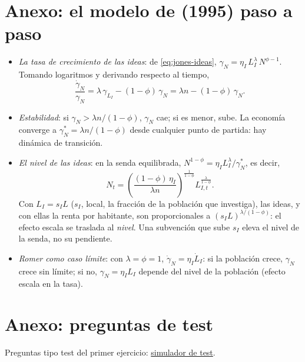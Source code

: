 \documentclass[11pt]{article}
\begin{document}
\section{Anexo: el modelo de  (1995) paso a paso}\label{anexo:jones}

\begin{itemize}
\item \emph{La tasa de crecimiento de las ideas}: de \eqref{eq:jones-ideas}, $\gamma_N=\eta_I\,L_I^{\lambda}\,N^{\phi-1}$. Tomando logaritmos y derivando respecto al tiempo,
  \[\frac{\dot\gamma_N}{\gamma_N}=\lambda\,\gamma_{L_I}-(1-\phi)\,\gamma_N=\lambda n-(1-\phi)\,\gamma_N.\]
\item \emph{Estabilidad}: si $\gamma_N>\lambda n/(1-\phi)$, $\gamma_N$ cae; si es menor, sube. La economía converge a $\gamma_N^*=\lambda n/(1-\phi)$ desde cualquier punto de partida: hay dinámica de transición. \findemo
\item \emph{El nivel de las ideas}: en la senda equilibrada, $N^{1-\phi}=\eta_IL_I^{\lambda}/\gamma_N^*$, es decir,
  \[N_t=\left(\frac{(1-\phi)\,\eta_I}{\lambda n}\right)^{\frac{1}{1-\phi}}L_{I,t}^{\frac{\lambda}{1-\phi}}.\]
  Con $L_I=s_IL$ ($s_I$, local, la fracción de la población que investiga), las ideas, y con ellas la renta por habitante, son proporcionales a $(s_IL)^{\lambda/(1-\phi)}$: el efecto escala se traslada al \emph{nivel}. Una subvención que sube $s_I$ eleva el nivel de la senda, no su pendiente.
\item \emph{Romer como caso límite}: con $\lambda=\phi=1$, $\dot\gamma_N=\eta_I\dot L_I$: si la población crece, $\gamma_N$ crece sin límite; si no, $\gamma_N=\eta_IL_I$ depende del nivel de la población (efecto escala en la tasa).
\end{itemize}

\section{Anexo: preguntas de test}\label{anexo:test}

\begin{anotaciones}
Preguntas tipo test del primer ejercicio: \href{https://www.victorgutierrezmarcos.es/oposicion/temario/primer-ejercicio/test/simulador.html?tema=3.A.44}{simulador de test}.
\end{anotaciones}

\bibliografia
\end{document}

